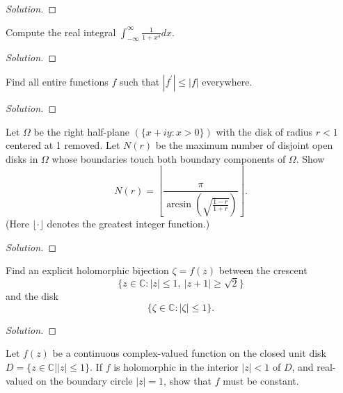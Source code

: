 \documentclass[10pt]{article}
\newenvironment{soln}{\begin{proof}[Solution]}{\end{proof}}
\begin{document}
\begin{soln}

\end{soln}



\begin{problem}
[2008 J-II-3]
Compute the real integral $\int_{-\infty}^{\infty} \frac{1}{1+x^4} d x$.
\end{problem}

\begin{soln}

\end{soln}



\begin{problem}
[2008 A-I-1]
Find all entire functions $f$ such that $\left|f^{\prime}\right| \leq|f|$ everywhere.
\end{problem}

\begin{soln}

\end{soln}



\begin{problem}
[2008 A-II-2]
Let $\Omega$ be the right half-plane $(\{x+i y: x>0\})$ with the disk of radius $r<1$ centered at 1 removed. Let $N(r)$ be the maximum number of disjoint open disks in $\Omega$ whose boundaries touch both boundary components of $\Omega$. Show
$$
N(r)=\left\lfloor\frac{\pi}{\arcsin \left(\sqrt{\frac{1-r}{1+r}}\right)}\right\rfloor .
$$
(Here $\lfloor\cdot\rfloor$ denotes the greatest integer function.)
\end{problem}

\begin{soln}

\end{soln}



\begin{problem}
[2007 J-I-2]
Find an explicit holomorphic bijection $\zeta=f(z)$ between the crescent
$$
\{z \in \mathbb{C}: |z|\leq 1,\ |z+1|\geq \sqrt{2}\}
$$
and the disk
$$
\{\zeta \in \mathbb{C}: |\zeta|\leq 1\}.
$$
\end{problem}

\begin{soln}

\end{soln}



\begin{problem}
[2007 J-II-1]
Let $f(z)$ be a continuous complex-valued function on the closed unit disk $D=\{z \in \mathbb{C}|| z \mid \leq 1\}$. If $f$ is holomorphic in the interior $|z|<1$ of $D$, and real-valued on the boundary circle $|z|=1$, show that $f$ must be constant.
\end{problem}
\end{document}

